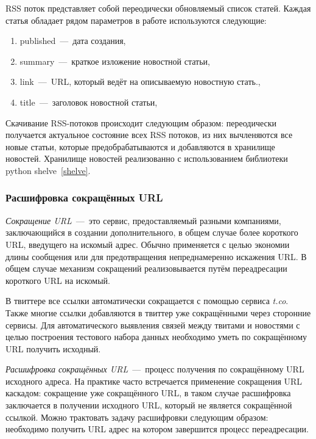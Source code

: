         RSS поток представляет собой переодически обновляемый список статей. Каждая статья обладает рядом параметров в работе используются следующие:
        \begin{enumerate}
            \item published~---~дата создания,
            \item summary~---~краткое изложение новостной статьи,
            \item link~---~URL, который ведёт на описываемую новостную стать.,
            \item title~---~заголовок новостной статьи,
        \end{enumerate}

        Скачивание RSS-потоков происходит следующим образом: переодически получается актуальное состояние всех RSS потоков, из них вычленяются все новые статьи,
        которые предобрабатываются и добавляются в хранилище новостей. Хранилище новостей реализованно с использованием библиотеки python shelve~\ref{shelve}.

    \subsubsection{Расшифровка сокращённых URL}
        \textit{Сокращение URL}~---~это сервис, предоставляемый разными компаниями, заключающийся в создании дополнительного, в общем случае более короткого URL, введущего на искомый адрес.
        Обычно применяется с целью экономии длины сообщения или для предотвращения непреднамеренно искажения URL.
        В общем случае механизм сокращений реализовывается путём переадресации короткого URL на искомый.

        В твиттере все ссылки автоматически сокращается с помощью сервиса \textit{t.co}. Также многие ссылки добавляются в твиттер уже сокращёнными через сторонние сервисы.
        Для автоматического выявления связей между твитами и новостями с целью построения тестового набора данных необходимо уметь по сокращённому URL получить исходный.

        \textit{Расшифровка сокращённых URL}~---~процесс получения по сокращённому URL исходного адреса.
        На практике часто встречается применение сокращения URL каскадом: сокращение уже сокращённого URL,
        в таком случае расшифровка заключается в получении исходного URL, который не является сокращённой ссылкой.
        Можно трактовать задачу расшифровки следующим образом: необходимо получить URL адрес на котором завершится процесс переадресации.

